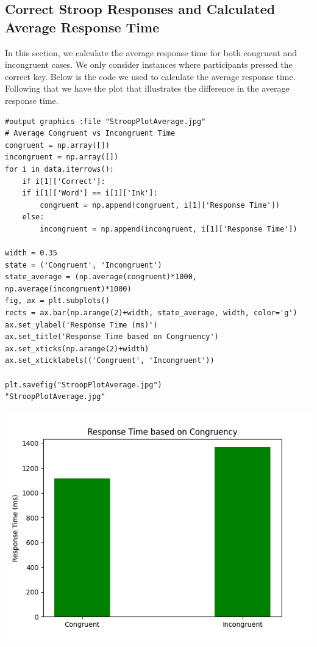 \documentclass{article}
\begin{document}
\pagebreak


\subsection{Correct Stroop Responses and Calculated Average Response Time}
\label{sec:org93bdb50}

In this section, we calculate the average response time for both congruent and incongruent cases. We only consider instances where participants pressed the correct key. Below is the code we used to calculate the average response time. Following that we have the plot that illustrates the difference in the average response time.

\begin{verbatim}
#output graphics :file "StroopPlotAverage.jpg"
# Average Congruent vs Incongruent Time
congruent = np.array([])
incongruent = np.array([])
for i in data.iterrows():
    if i[1]['Correct']:
	if i[1]['Word'] == i[1]['Ink']:
	    congruent = np.append(congruent, i[1]['Response Time'])
	else:
	    incongruent = np.append(incongruent, i[1]['Response Time'])

width = 0.35
state = ('Congruent', 'Incongruent')
state_average = (np.average(congruent)*1000, np.average(incongruent)*1000)
fig, ax = plt.subplots()
rects = ax.bar(np.arange(2)+width, state_average, width, color='g')
ax.set_ylabel('Response Time (ms)')
ax.set_title('Response Time based on Congruency')
ax.set_xticks(np.arange(2)+width)
ax.set_xticklabels(('Congruent', 'Incongruent'))

plt.savefig("StroopPlotAverage.jpg")
"StroopPlotAverage.jpg"
\end{verbatim}

\begin{center}
\includegraphics[width=.9\linewidth]{StroopPlotAverage.jpg}
\end{center}
\end{document}
